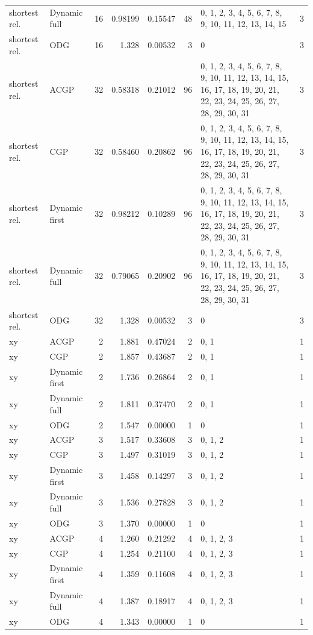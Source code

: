 \documentclass[10pt,a4paper]{article}
\begin{document}
\begin{longtable}{@{}p{23mm}p{29mm}rrrrp{36mm}r@{}}
shortest rel. & Dynamic full & 16 & 0.98199 & 0.15547 & 48 & 0, 1, 2, 3, 4, 5, 6, 7, 8, 9, 10, 11, 12, 13, 14, 15 & 3 \\
shortest rel. & ODG & 16 & 1.328 & 0.00532 & 3 & 0 & 3 \\
shortest rel. & ACGP & 32 & 0.58318 & 0.21012 & 96 & 0, 1, 2, 3, 4, 5, 6, 7, 8, 9, 10, 11, 12, 13, 14, 15, 16, 17, 18, 19, 20, 21, 22, 23, 24, 25, 26, 27, 28, 29, 30, 31 & 3 \\
shortest rel. & CGP & 32 & 0.58460 & 0.20862 & 96 & 0, 1, 2, 3, 4, 5, 6, 7, 8, 9, 10, 11, 12, 13, 14, 15, 16, 17, 18, 19, 20, 21, 22, 23, 24, 25, 26, 27, 28, 29, 30, 31 & 3 \\
shortest rel. & Dynamic first & 32 & 0.98212 & 0.10289 & 96 & 0, 1, 2, 3, 4, 5, 6, 7, 8, 9, 10, 11, 12, 13, 14, 15, 16, 17, 18, 19, 20, 21, 22, 23, 24, 25, 26, 27, 28, 29, 30, 31 & 3 \\
shortest rel. & Dynamic full & 32 & 0.79065 & 0.20902 & 96 & 0, 1, 2, 3, 4, 5, 6, 7, 8, 9, 10, 11, 12, 13, 14, 15, 16, 17, 18, 19, 20, 21, 22, 23, 24, 25, 26, 27, 28, 29, 30, 31 & 3 \\
shortest rel. & ODG & 32 & 1.328 & 0.00532 & 3 & 0 & 3 \\
xy & ACGP & 2 & 1.881 & 0.47024 & 2 & 0, 1 & 1 \\
xy & CGP & 2 & 1.857 & 0.43687 & 2 & 0, 1 & 1 \\
xy & Dynamic first & 2 & 1.736 & 0.26864 & 2 & 0, 1 & 1 \\
xy & Dynamic full & 2 & 1.811 & 0.37470 & 2 & 0, 1 & 1 \\
xy & ODG & 2 & 1.547 & 0.00000 & 1 & 0 & 1 \\
xy & ACGP & 3 & 1.517 & 0.33608 & 3 & 0, 1, 2 & 1 \\
xy & CGP & 3 & 1.497 & 0.31019 & 3 & 0, 1, 2 & 1 \\
xy & Dynamic first & 3 & 1.458 & 0.14297 & 3 & 0, 1, 2 & 1 \\
xy & Dynamic full & 3 & 1.536 & 0.27828 & 3 & 0, 1, 2 & 1 \\
xy & ODG & 3 & 1.370 & 0.00000 & 1 & 0 & 1 \\
xy & ACGP & 4 & 1.260 & 0.21292 & 4 & 0, 1, 2, 3 & 1 \\
xy & CGP & 4 & 1.254 & 0.21100 & 4 & 0, 1, 2, 3 & 1 \\
xy & Dynamic first & 4 & 1.359 & 0.11608 & 4 & 0, 1, 2, 3 & 1 \\
xy & Dynamic full & 4 & 1.387 & 0.18917 & 4 & 0, 1, 2, 3 & 1 \\
xy & ODG & 4 & 1.343 & 0.00000 & 1 & 0 & 1 \\

\end{longtable}
\end{document}
